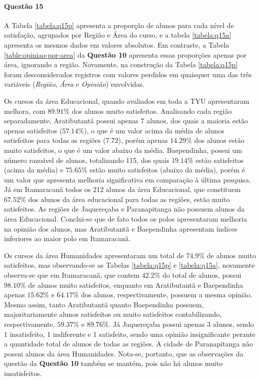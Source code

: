 \documentclass[10pt,a4paper,oneside]{article}
\newcommand{\arat}{Aratibutantã\xspace}
\newcommand{\baep}{Baependinha\xspace}
\newcommand{\itam}{Itamaracanã\xspace}
\newcommand{\jaqu}{Jaquereçaba\xspace}
\newcommand{\para}{Paranapitanga\xspace}
\newcommand{\edu}{Educacional\xspace}
\newcommand{\hum}{Humanidades\xspace}
\begin{document}
\paragraph{Questão 15}

A Tabela \ref{tabela:q15p} apresenta a proporção de alunos para cada nível de satisfação, agrupados por Região e Área do curso, e a tabela \ref{tabela:q15a} apresenta os mesmos dados em valores absolutos. Em contraste, a Tabela \ref{table:opiniao-por-area} da \textbf{Questão 10} apresenta essas proporções apenas por área, ignorando a região. Novamente, na construção da Tabela \ref{tabela:q15p} foram desconsiderados registros com valores perdidos em quaisquer uma das três variáveis (\textit{Região}, \textit{Área} e \textit{Opinião}) envolvidas. 




Os cursos da área \edu, quando avaliados em toda a TYU apresentaram melhora, com $89.91\%$ dos alunos muito satisfeitos. Analisando cada região separadamente, \arat possui apenas 7 alunos, dos quais a maioria estão apenas satisfeitos ($57.14\%$), o que é um valor acima da média de alunos satisfeitos para todas as regiões ($7.72$), porém apenas $14.29\%$ dos alunos estão muito satisfeitos, o que é um valor abaixo da média. \baep, possui um número razoável de alunos, totalizando 115, dos quais $19.14\%$ estão satisfeitos (acima da média) e $75.65\%$ estão muito satisfeitos (abaixo da média), porém é um valor que apresenta melhoria significativa em comparação à última pesquisa. Já em \itam todos os 212 alunos da área \edu, que constituem $67.52\%$ dos alunos da área educacional para todas as regiões, estão muito satisfeitos. As regiões de \jaqu e \para não possuem alunos da área \edu. Conclui-se que de fato todos os polos apresentaram melhoria na opinião dos alunos, mas \arat e \baep apresentam índices inferiores ao maior polo em \itam.

Os cursos da área \hum apresentaram um total de $74.9\%$ de alunos muito satisfeitos, mas observando-se as Tabelas \ref{tabela:q15p} e \ref{tabela:q15a}, novamente observa-se que em \itam, que contem $42.2\%$ do total de alunos, possui  $98.10\%$ de alunos muito satisfeitos, enquanto em \arat e \baep apenas $15.62\%$ e $64.17\%$ dos alunos, respectivamente, possuem a mesma opinião. Mesmo assim, tanto \arat quanto \baep possuem, majoritariamente alunos satisfeitos ou muito satisfeitos contabilizando, respectivamente, $59.37\%$ e $89.76\%$. Já \jaqu possui apenas 3 alunos, sendo 1 insatisfeito, 1 indiferente e 1 satisfeito, sendo uma opinião insignificante perante a quantidade total de alunos de todas as regiões. A cidade de \para não possui alunos da área \hum. Nota-se, portanto, que as observações da questão da \textbf{Questão 10} também se mantém, pois não há alunos muito insatisfeitos.
\end{document}
